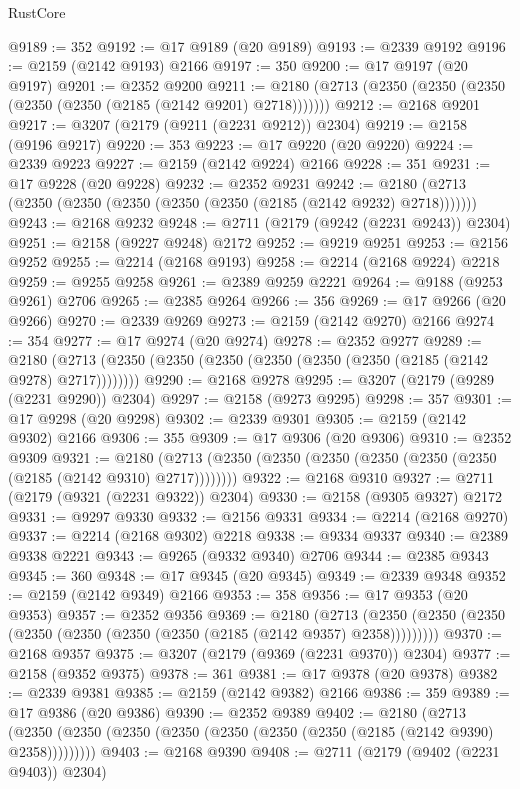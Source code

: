 \begin{lexlean}{RustCore}
\begin{coremodule}
@9189 := 352
@9192 := @17 @9189 (@20 @9189)
@9193 := @2339 @9192
@9196 := @2159 (@2142 @9193) @2166
@9197 := 350
@9200 := @17 @9197 (@20 @9197)
@9201 := @2352 @9200
@9211 := @2180 (@2713 (@2350 (@2350 (@2350 (@2350 (@2350 (@2185 (@2142 @9201) @2718)))))))
@9212 := @2168 @9201
@9217 := @3207 (@2179 (@9211 (@2231 @9212)) @2304)
@9219 := @2158 (@9196 @9217)
@9220 := 353
@9223 := @17 @9220 (@20 @9220)
@9224 := @2339 @9223
@9227 := @2159 (@2142 @9224) @2166
@9228 := 351
@9231 := @17 @9228 (@20 @9228)
@9232 := @2352 @9231
@9242 := @2180 (@2713 (@2350 (@2350 (@2350 (@2350 (@2350 (@2185 (@2142 @9232) @2718)))))))
@9243 := @2168 @9232
@9248 := @2711 (@2179 (@9242 (@2231 @9243)) @2304)
@9251 := @2158 (@9227 @9248) @2172
@9252 := @9219 @9251
@9253 := @2156 @9252
@9255 := @2214 (@2168 @9193)
@9258 := @2214 (@2168 @9224) @2218
@9259 := @9255 @9258
@9261 := @2389 @9259 @2221
@9264 := @9188 (@9253 @9261) @2706
@9265 := @2385 @9264
@9266 := 356
@9269 := @17 @9266 (@20 @9266)
@9270 := @2339 @9269
@9273 := @2159 (@2142 @9270) @2166
@9274 := 354
@9277 := @17 @9274 (@20 @9274)
@9278 := @2352 @9277
@9289 := @2180 (@2713 (@2350 (@2350 (@2350 (@2350 (@2350 (@2350 (@2185 (@2142 @9278) @2717))))))))
@9290 := @2168 @9278
@9295 := @3207 (@2179 (@9289 (@2231 @9290)) @2304)
@9297 := @2158 (@9273 @9295)
@9298 := 357
@9301 := @17 @9298 (@20 @9298)
@9302 := @2339 @9301
@9305 := @2159 (@2142 @9302) @2166
@9306 := 355
@9309 := @17 @9306 (@20 @9306)
@9310 := @2352 @9309
@9321 := @2180 (@2713 (@2350 (@2350 (@2350 (@2350 (@2350 (@2350 (@2185 (@2142 @9310) @2717))))))))
@9322 := @2168 @9310
@9327 := @2711 (@2179 (@9321 (@2231 @9322)) @2304)
@9330 := @2158 (@9305 @9327) @2172
@9331 := @9297 @9330
@9332 := @2156 @9331
@9334 := @2214 (@2168 @9270)
@9337 := @2214 (@2168 @9302) @2218
@9338 := @9334 @9337
@9340 := @2389 @9338 @2221
@9343 := @9265 (@9332 @9340) @2706
@9344 := @2385 @9343
@9345 := 360
@9348 := @17 @9345 (@20 @9345)
@9349 := @2339 @9348
@9352 := @2159 (@2142 @9349) @2166
@9353 := 358
@9356 := @17 @9353 (@20 @9353)
@9357 := @2352 @9356
@9369 := @2180
    (@2713 (@2350 (@2350 (@2350 (@2350 (@2350 (@2350 (@2350 (@2185 (@2142 @9357) @2358)))))))))
@9370 := @2168 @9357
@9375 := @3207 (@2179 (@9369 (@2231 @9370)) @2304)
@9377 := @2158 (@9352 @9375)
@9378 := 361
@9381 := @17 @9378 (@20 @9378)
@9382 := @2339 @9381
@9385 := @2159 (@2142 @9382) @2166
@9386 := 359
@9389 := @17 @9386 (@20 @9386)
@9390 := @2352 @9389
@9402 := @2180
    (@2713 (@2350 (@2350 (@2350 (@2350 (@2350 (@2350 (@2350 (@2185 (@2142 @9390) @2358)))))))))
@9403 := @2168 @9390
@9408 := @2711 (@2179 (@9402 (@2231 @9403)) @2304)

\end{coremodule}
\end{lexlean}
